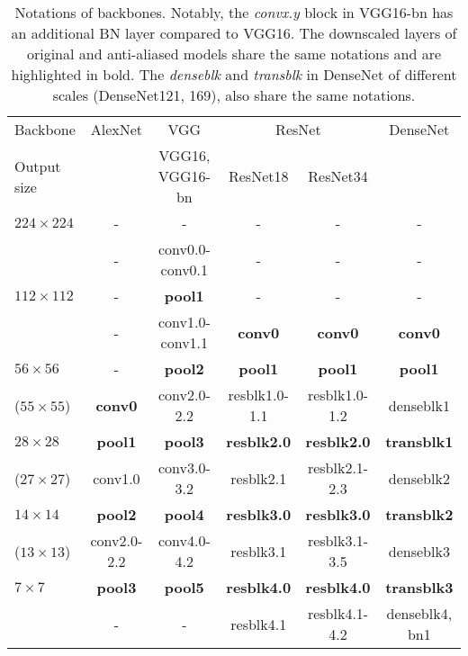 \documentclass{article}
\begin{document}
\begin{table*}[h]
    \begin{center}
    \begin{tabular}{lccccc}
    \hline
    Backbone&AlexNet&{VGG}&\multicolumn{2}{c}{ResNet} & {DenseNet}\\

    Output size&&VGG16, VGG16-bn&ResNet18&ResNet34&\\
    \hline
      $224 \times 224$ &- & -& - & -& - \\
      & - &conv0.0-conv0.1 & -& -& -\\
      $112 \times 112$ &- & \textbf{pool1} &- &- &- \\
            &- &conv1.0-conv1.1& \textbf{conv0}&\textbf{conv0} &\textbf{conv0}\\
      $56 \times 56$ & -& \textbf{pool2}& \textbf{pool1}& \textbf{pool1}& \textbf{pool1}  \\
       ($55 \times 55$)& \textbf{conv0}& conv2.0-2.2&resblk1.0-1.1& resblk1.0-1.2& denseblk1\\
      $28 \times 28$ & \textbf{pool1}& \textbf{pool3} & \textbf{resblk2.0} & \textbf{resblk2.0}
      &\textbf{transblk1} \\
      ($27 \times 27$)&conv1.0& conv3.0-3.2& resblk2.1&resblk2.1-2.3& denseblk2\\
      $14 \times 14$ &\textbf{pool2}&  \textbf{pool4} &\textbf{resblk3.0}&\textbf{resblk3.0}&\textbf{transblk2} \\
      ($13 \times 13$)&conv2.0-2.2& conv4.0-4.2 &resblk3.1 &resblk3.1-3.5& denseblk3\\
      $7 \times 7$ & \textbf{pool3}& \textbf{pool5}&\textbf{resblk4.0} &\textbf{resblk4.0}&\textbf{transblk3}  \\
      & - & -& resblk4.1& resblk4.1-4.2& denseblk4, bn1\\ 
      \hline
    \end{tabular}
    \end{center}
     \caption{Notations of backbones. Notably, the \textit{convx.y} block in VGG16-bn has an additional BN layer compared to VGG16. The downscaled layers of original and anti-aliased models share the same notations and are highlighted in bold. The \textit{denseblk} and \textit{transblk} in DenseNet of different scales (DenseNet121, 169), also share the same notations.} \label{tab:layer_name}
\end{table*}
\end{document}
